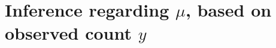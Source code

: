 \documentclass[10pt]{beamer}\usepackage[]{graphicx}\usepackage[]{color}
\begin{document}

\section{Inference regarding $\mu$, based on observed count $y$}
\end{document}
